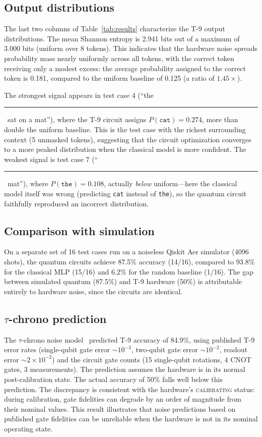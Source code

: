 \documentclass[prl,twocolumn,superscriptaddress,longbibliography,floatfix]{revtex4-2}
\begin{document}
\subsection{Output distributions}

The last two columns of Table~\ref{tab:results} characterize the T-9 output distributions. The mean Shannon entropy is 2.941 bits out of a maximum of 3.000 bits (uniform over 8 tokens). This indicates that the hardware noise spreads probability mass nearly uniformly across all tokens, with the correct token receiving only a modest excess: the average probability assigned to the correct token is 0.181, compared to the uniform baseline of 0.125 (a ratio of $1.45\times$).

The strongest signal appears in test case 4 (``the \rule{1em}{0.4pt}\, sat on a mat''), where the T-9 circuit assigns $P(\texttt{cat}) = 0.274$, more than double the uniform baseline. This is the test case with the richest surrounding context (5 unmasked tokens), suggesting that the circuit optimization converges to a more peaked distribution when the classical model is more confident. The weakest signal is test case 7 (``\rule{1em}{0.4pt}\, mat''), where $P(\texttt{the}) = 0.108$, actually \emph{below} uniform---here the classical model itself was wrong (predicting \texttt{cat} instead of \texttt{the}), so the quantum circuit faithfully reproduced an incorrect distribution.

\subsection{Comparison with simulation}

On a separate set of 16 test cases run on a noiseless Qiskit Aer simulator (4096 shots), the quantum circuits achieve 87.5\% accuracy (14/16), compared to 93.8\% for the classical MLP (15/16) and 6.2\% for the random baseline (1/16). The gap between simulated quantum (87.5\%) and T-9 hardware (50\%) is attributable entirely to hardware noise, since the circuits are identical.

\subsection{$\tau$-chrono prediction}

The $\tau$-chrono noise model~\cite{Huang2026tauchrono} predicted T-9 accuracy of 84.9\%, using published T-9 error rates (single-qubit gate error $\sim 10^{-3}$, two-qubit gate error $\sim 10^{-2}$, readout error $\sim 2 \times 10^{-2}$) and the circuit gate counts (15 single-qubit rotations, 4 CNOT gates, 3 measurements). The prediction assumes the hardware is in its normal post-calibration state. The actual accuracy of 50\% falls well below this prediction. The discrepancy is consistent with the hardware's \textsc{calibrating} status: during calibration, gate fidelities can degrade by an order of magnitude from their nominal values. This result illustrates that noise predictions based on published gate fidelities can be unreliable when the hardware is not in its nominal operating state.
\end{document}
